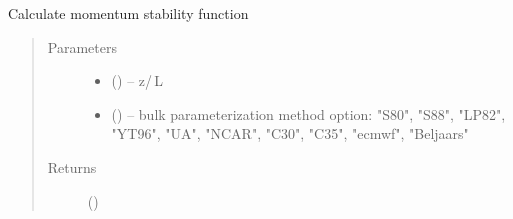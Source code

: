 \documentclass[letterpaper,10pt,english]{sphinxmanual}
\begin{document}
\begin{fulllineitems}
\label{\detokenize{index:flux_subs.psim_calc}}
Calculate momentum stability function
\begin{quote}\begin{description}
\item[{Parameters}] \leavevmode\begin{itemize}
\item {} 
 (\href{https://docs.python.org/3/library/functions.html\#float}{}) -- z\slash\,L

\item {} 
 (\href{https://docs.python.org/3/library/stdtypes.html\#str}{}) -- bulk parameterization method option: "S80", "S88", "LP82", "YT96", "UA", "NCAR", "C30", "C35", "ecmwf", "Beljaars"

\end{itemize}

\item[{Returns}] \leavevmode
{} (\href{https://docs.python.org/3/library/functions.html\#float}{})

\end{description}\end{quote}

\end{fulllineitems}

\end{document}
